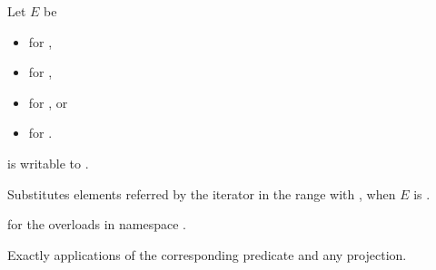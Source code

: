 \begin{itemdescr}
\pnum
Let $E$ be
\begin{itemize}
\item {} for ,
\item {} for ,
\item {} for , or
\item {} for .
\end{itemize}


\pnum
\mandates
{} is writable to .

\pnum
\effects
Substitutes elements referred by the iterator 
in the range  with ,
when $E$ is .

\pnum
\returns
{} for the overloads in namespace .

\pnum
\complexity
Exactly  applications
of the corresponding predicate and any projection.
\end{itemdescr}

